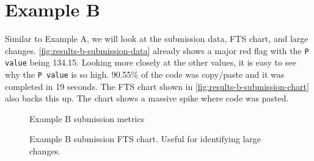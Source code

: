 \newpage

\section{Example B}
Similar to Example A, we will look at the submission data, FTS chart, and large changes. \autoref{fig:results-b-submission-data} already shows a major red flag with the \texttt{P value} being 134.15. Looking more closely at the other values, it is easy to see why the \texttt{P value} is so high. 90.55\% of the code was copy/paste and it was completed in 19 seconds. The FTS chart shown in \autoref{fig:results-b-submission-chart} also backs this up. The chart shows a massive spike where code was pasted.

\begin{figure}[H]
  \centering
  \caption[Submission Results B Data]{Example B submission metrics}
  \label{fig:results-b-submission-data}
\end{figure}

\begin{figure}[H]
  \centering
  \caption[Submission Results B Chart]{Example B submission FTS chart. Useful for identifying large changes.}
  \label{fig:results-b-submission-chart}
\end{figure}

